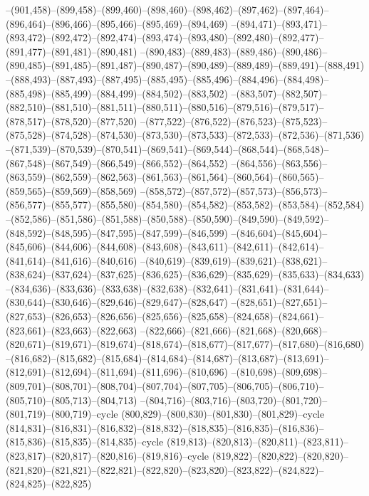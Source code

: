 --(901,458)--(899,458)--(899,460)--(898,460)--(898,462)--(897,462)--(897,464)--(896,464)--(896,466)--(895,466)--(895,469)--(894,469)
--(894,471)--(893,471)--(893,472)--(892,472)--(892,474)--(893,474)--(893,480)--(892,480)--(892,477)--(891,477)--(891,481)--(890,481)
--(890,483)--(889,483)--(889,486)--(890,486)--(890,485)--(891,485)--(891,487)--(890,487)--(890,489)--(889,489)--(889,491)--(888,491)
--(888,493)--(887,493)--(887,495)--(885,495)--(885,496)--(884,496)--(884,498)--(885,498)--(885,499)--(884,499)--(884,502)--(883,502)
--(883,507)--(882,507)--(882,510)--(881,510)--(881,511)--(880,511)--(880,516)--(879,516)--(879,517)--(878,517)--(878,520)--(877,520)
--(877,522)--(876,522)--(876,523)--(875,523)--(875,528)--(874,528)--(874,530)--(873,530)--(873,533)--(872,533)--(872,536)--(871,536)
--(871,539)--(870,539)--(870,541)--(869,541)--(869,544)--(868,544)--(868,548)--(867,548)--(867,549)--(866,549)--(866,552)--(864,552)
--(864,556)--(863,556)--(863,559)--(862,559)--(862,563)--(861,563)--(861,564)--(860,564)--(860,565)--(859,565)--(859,569)--(858,569)
--(858,572)--(857,572)--(857,573)--(856,573)--(856,577)--(855,577)--(855,580)--(854,580)--(854,582)--(853,582)--(853,584)--(852,584)
--(852,586)--(851,586)--(851,588)--(850,588)--(850,590)--(849,590)--(849,592)--(848,592)--(848,595)--(847,595)--(847,599)--(846,599)
--(846,604)--(845,604)--(845,606)--(844,606)--(844,608)--(843,608)--(843,611)--(842,611)--(842,614)--(841,614)--(841,616)--(840,616)
--(840,619)--(839,619)--(839,621)--(838,621)--(838,624)--(837,624)--(837,625)--(836,625)--(836,629)--(835,629)--(835,633)--(834,633)
--(834,636)--(833,636)--(833,638)--(832,638)--(832,641)--(831,641)--(831,644)--(830,644)--(830,646)--(829,646)--(829,647)--(828,647)
--(828,651)--(827,651)--(827,653)--(826,653)--(826,656)--(825,656)--(825,658)--(824,658)--(824,661)--(823,661)--(823,663)--(822,663)
--(822,666)--(821,666)--(821,668)--(820,668)--(820,671)--(819,671)--(819,674)--(818,674)--(818,677)--(817,677)--(817,680)--(816,680)
--(816,682)--(815,682)--(815,684)--(814,684)--(814,687)--(813,687)--(813,691)--(812,691)--(812,694)--(811,694)--(811,696)--(810,696)
--(810,698)--(809,698)--(809,701)--(808,701)--(808,704)--(807,704)--(807,705)--(806,705)--(806,710)--(805,710)--(805,713)--(804,713)
--(804,716)--(803,716)--(803,720)--(801,720)--(801,719)--(800,719)--cycle
(800,829)--(800,830)--(801,830)--(801,829)--cycle
(814,831)--(816,831)--(816,832)--(818,832)--(818,835)--(816,835)--(816,836)--(815,836)--(815,835)--(814,835)--cycle
(819,813)--(820,813)--(820,811)--(823,811)--(823,817)--(820,817)--(820,816)--(819,816)--cycle
(819,822)--(820,822)--(820,820)--(821,820)--(821,821)--(822,821)--(822,820)--(823,820)--(823,822)--(824,822)--(824,825)--(822,825)

